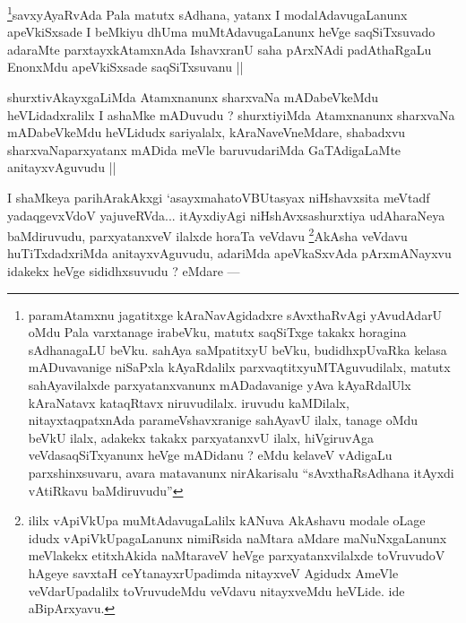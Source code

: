 \begin{artha}
\footnote[1]{paramAtamxnu jagatitxge kAraNavAgidadxre sAvxthaRvAgi yAvudAdarU oMdu Pala varxtanage irabeVku, matutx saqSiTxge takakx horagina sAdhanagaLU beVku. sahAya saMpatitxyU beVku, budidhxpUvaRka kelasa mADuvavanige niSaPxla kAyaRdalilx parxvaqtitxyuMTAguvudilalx, matutx sahAyavilalxde parxyatanxvanunx mADadavanige yAva kAyaRdalUlx kAraNatavx kataqRtavx niruvudilalx. iruvudu kaMDilalx, nitayxtaqpatxnAda parameVshavxranige sahAyavU ilalx, tanage oMdu beVkU ilalx, adakekx takakx parxyatanxvU ilalx, hiVgiruvAga veVdasaqSiTxyanunx heVge mADidanu ? eMdu kelaveV vAdigaLu parxshinxsuvaru, avara matavanunx nirAkarisalu ``sAvxthaRsAdhana itAyxdi vAtiRkavu baMdiruvudu''}savxyAyaRvAda Pala matutx sAdhana, yatanx I modalAdavugaLanunx apeVkiSxsade I beMkiyu dhUma muMtAdavugaLanunx heVge saqSiTxsuvado adaraMte parxtayxkAtamxnAda IshavxranU saha pArxNAdi padAthaRgaLu EnonxMdu apeVkiSxsade saqSiTxsuvanu ||
\end{artha}

\begin{artha}
shurxtivAkayxgaLiMda Atamxnanunx sharxvaNa mADabeVkeMdu heVLidadxralilx I ashaMke mADuvudu ? shurxtiyiMda Atamxnanunx sharxvaNa mADabeVkeMdu heVLidudx sariyalalx, kAraNaveVneMdare, shabadxvu sharxvaNaparxyatanx mADida meVle baruvudariMda GaTAdigaLaMte anitayxvAguvudu ||
\end{artha}

\begin{artha}
I shaMkeya parihArakAkxgi `asayxmahatoVBUtasyax niHshavxsita meVtadf yadaqgevxVdoV yajuveRVda... itAyxdiyAgi niHshAvxsashurxtiya udAharaNeya baMdiruvudu, parxyatanxveV ilalxde horaTa veVdavu \footnote[2]{ililx vApiVkUpa muMtAdavugaLalilx kANuva AkAshavu modale oLage idudx vApiVkUpagaLanunx nimiRsida naMtara aMdare maNuNxgaLanunx meVlakekx etitxhAkida naMtaraveV heVge parxyatanxvilalxde toVruvudoV hAgeye savxtaH ceYtanayxrUpadimda nitayxveV Agidudx AmeVle veVdarUpadalilx toVruvudeMdu veVdavu nitayxveMdu heVLide. ide aBipArxyavu.}AkAsha veVdavu huTiTxdadxriMda anitayxvAguvudu, adariMda apeVkaSxvAda pArxmANayxvu idakekx heVge sididhxsuvudu ? eMdare ---
\end{artha}

